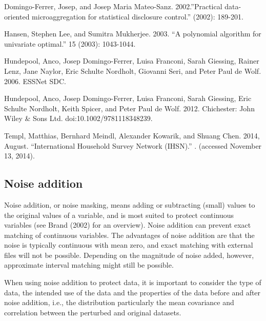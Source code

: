 \documentclass[letterpaper,10pt,english]{sphinxmanual}
\begin{document}

Domingo-Ferrer, Josep, and Josep Maria Mateo-Sanz. 2002.”Practical
data-oriented microaggregation for statistical disclosure control.”
 (2002):
189-201.

Hansen, Stephen Lee, and Sumitra Mukherjee. 2003. “A polynomial
algorithm for univariate optimal.”  15 (2003): 1043-1044.

Hundepool, Anco, Josep Domingo-Ferrer, Luisa Franconi, Sarah Giessing,
Rainer Lenz, Jane Naylor, Eric Schulte Nordholt, Giovanni Seri, and
Peter Paul de Wolf. 2006. 
ESSNet SDC. 

Hundepool, Anco, Josep Domingo-Ferrer, Luisa Franconi, Sarah Giessing,
Eric Schulte Nordholt, Keith Spicer, and Peter Paul de Wolf. 2012.
 Chichester: John Wiley \& Sons Ltd.
doi:10.1002/9781118348239.

Templ, Matthias, Bernhard Meindl, Alexander Kowarik, and Shuang Chen.
2014, August. “International Household Survey Network (IHSN).”
. (accessed
November 13, 2014).


\subsection{Noise addition}
\label{\detokenize{anon_methods:noise-addition}}
Noise addition, or noise masking, means adding or subtracting (small)
values to the original values of a variable, and is most suited to
protect continuous variables (see Brand (2002) for an overview). Noise
addition can prevent exact matching of continuous variables. The
advantages of noise addition are that the noise is typically continuous
with mean zero, and exact matching with external files will not be
possible. Depending on the magnitude of noise added, however,
approximate interval matching might still be possible.

When using noise addition to protect data, it is important to consider
the type of data, the intended use of the data and the properties of the
data before and after noise addition, i.e., the distribution \textendash{}
particularly the mean \textendash{} covariance and correlation between the perturbed
and original datasets.
\end{document}
